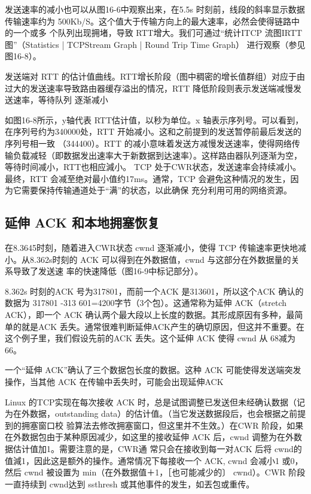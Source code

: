 发送速率的减小也可以从图16-6中观察出来，在5.5s 时刻前，线段的斜率显示数据传输速率约为 500Kb/S。这个值大于传输方向上的最大速率，必然会使得链路中的一个或多
个队列出现拥堵，导致 RTT增大。我们可通过“统计ITCP 流图IRTT 图”（Statistics | TCPStream Graph | Round Trip Time Graph） 进行观察（参见图16-8）。

发送端对 RTT 的估计值曲线。RTT增长阶段（图中稠密的增长值群组）对应于由过大的发送速率导致路由器缓存溢出的情况，RTT 降低阶段则表示发送端减慢发送速率，等待队列
逐渐减小

如图16-8所示，y轴代表 RTT估计值，以秒为单位。x 轴表示序列号。可以看到，在序列号约为340000处，RTT 开始减小。这和之前提到的发送暂停前最后发送的序列号相一致
（344400）。RTT 的减小意味着发送方减慢发送速率，使得网络传输负载减轻（即数据发出速率大于新数据到达速率）。这样路由器队列逐渐为空，等待时间减小，RTT也相应減小。
TCP 处于CWR状态，发送速率会持续减小。最终，RTT 会减至绝对最小值约17ms。通常，TCP 会避免这种情况的发生，因为它需要保持传输通道处于“满”的状态，以此确保
充分利用可用的网络资源。

\subsection{延伸 ACK 和本地拥塞恢复}
在8.3645时刻，随着进入CWR状态 cwnd 逐渐减小，使得 TCP 传输速率更快地减小。从8.362s时刻的 ACK 可以得到在外数据值，cwnd 与这部分在外数据量的关系导致了发送速
率的快速降低（图16-9中标记部分）。

8.362s 时刻的ACK 号为317801，而前一个ACK 是313601，所以这个ACK 确认的数据为 317801 -313 601=4200字节（3个包）。这通常称为延伸 ACK（stretch ACK），即一个
ACK 确认两个最大段以上长度的数据。其形成原因有多种，最简单的就是ACK 丢失。通常很难判断延伸ACK产生的确切原因，但这并不重要。在这个例子里，我们假设先前的ACK
丢失。这个延伸 ACK 使得 cwnd 从 68减为66。

一个“延伸 ACK”确认了三个数据包长度的数据。这种 ACK 可能使得发送端突发操作，当其他 ACK 在传输中丢失时，可能会出现延伸ACK

Linux 的TCP实现在每次接收 ACK 时，总是试图调整已发送但未经确认数据（记为在外数据，outstanding data）的估计值。（当它发送数据段后，也会根据之前提到的拥塞窗口校
验算法去修改拥塞窗口，但这里并不生效。）在CWR 阶段，如果在外数据包由于某种原因减少，如这里的接收延伸 ACK 后，cwnd 调整为在外数据估计值加1。需要注意的是，CWR通
常只会在接收到每一对ACK 后将 cwnd的值減1，因此这是额外的操作。通常情况下每接收一个 ACK, cwnd 会减小1 或0，然后 cwnd 被设置为 min（在外数据值＋1，［也可能减少的〕
cwnd）。CWR 阶段一直持续到 cwnd达到 ssthresh 或其他事件的发生，如丟包或重传。


